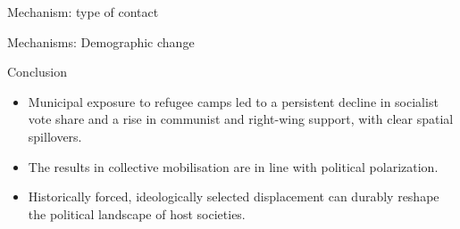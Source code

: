 \documentclass[10pt]{beamer}
\begin{document}
\begin{frame}{Mechanism: type of contact}
\begin{figure}[H]



\end{figure}





\end{frame}


\begin{frame}[label=refugees]{Mechanisms: Demographic change}



\hyperlink{settlement}{}

\end{frame}






\begin{frame}{Conclusion}

\begin{itemize}
  \item Municipal exposure to refugee camps led to a persistent decline in socialist vote share and a rise in communist and right-wing support, with clear spatial spillovers.
  \item The results in collective mobilisation are in line with political polarization. 
  \item Historically forced, ideologically selected displacement can durably reshape the political landscape of host societies.
\end{itemize}

\end{frame}
\end{document}

